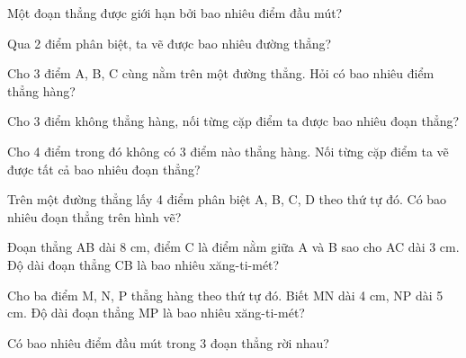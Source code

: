 \begin{ex}
Một đoạn thẳng được giới hạn bởi bao nhiêu điểm đầu mút?
\end{ex}

\begin{ex}
Qua 2 điểm phân biệt, ta vẽ được bao nhiêu đường thẳng?
\end{ex}

\begin{ex}
Cho 3 điểm A, B, C cùng nằm trên một đường thẳng. Hỏi có bao nhiêu điểm thẳng hàng?
\end{ex}

\begin{ex}
Cho 3 điểm không thẳng hàng, nối từng cặp điểm ta được bao nhiêu đoạn thẳng?
\end{ex}

\begin{ex}
Cho 4 điểm trong đó không có 3 điểm nào thẳng hàng. Nối từng cặp điểm ta vẽ được tất cả bao nhiêu đoạn thẳng?
\end{ex}

\begin{ex}
Trên một đường thẳng lấy 4 điểm phân biệt A, B, C, D theo thứ tự đó. Có bao nhiêu đoạn thẳng trên hình vẽ?
\end{ex}

\begin{ex}
Đoạn thẳng AB dài 8 cm, điểm C là điểm nằm giữa A và B sao cho AC dài 3 cm. Độ dài đoạn thẳng CB là bao nhiêu xăng-ti-mét?
\end{ex}

\begin{ex}
Cho ba điểm M, N, P thẳng hàng theo thứ tự đó. Biết MN dài 4 cm, NP dài 5 cm. Độ dài đoạn thẳng MP là bao nhiêu xăng-ti-mét?
\end{ex}

\begin{ex}
Có bao nhiêu điểm đầu mút trong 3 đoạn thẳng rời nhau?
\end{ex}

